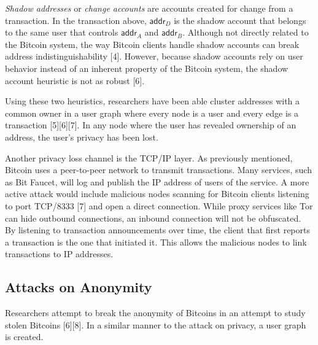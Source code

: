 \emph{Shadow addresses} or \emph{change accounts} are accounts created for change from a transaction. In the transaction above, $\mathsf{addr}_D$ is the shadow account that belongs to the same user that controls $\mathsf{addr}_A$ and $\mathsf{addr}_B$. Although not directly related to the Bitcoin system, the way Bitcoin clients handle shadow accounts can break address indistinguishability [4]. However, because shadow accounts rely on user behavior instead of an inherent property of the Bitcoin system, the shadow account heuristic is not as robust [6].

Using these two heuristics, researchers have been able cluster addresses with a common owner in a user graph where every node is a user and every edge is a transaction [5][6][7]. In any node where the user has revealed ownership of an address, the user's privacy has been lost.

Another privacy loss channel is the TCP/IP layer. As previously mentioned, Bitcoin uses a peer-to-peer network to transmit transactions. Many services, such as Bit Faucet, will log and publish the IP address of users of the service. A more active attack would include malicious nodes scanning for Bitcoin clients listening to port TCP/8333 [7] and open a direct connection. While proxy services like Tor can hide outbound connections, an inbound connection will not be obfuscated. By listening to transaction announcements over time, the client that first reports a transaction is the one that initiated it. This allows the malicious nodes to link transactions to IP addresses.

\subsection{Attacks on Anonymity}
Researchers attempt to break the anonymity of Bitcoins in an attempt to study stolen Bitcoins [6][8]. In a similar manner to the attack on privacy, a user graph is created. 


